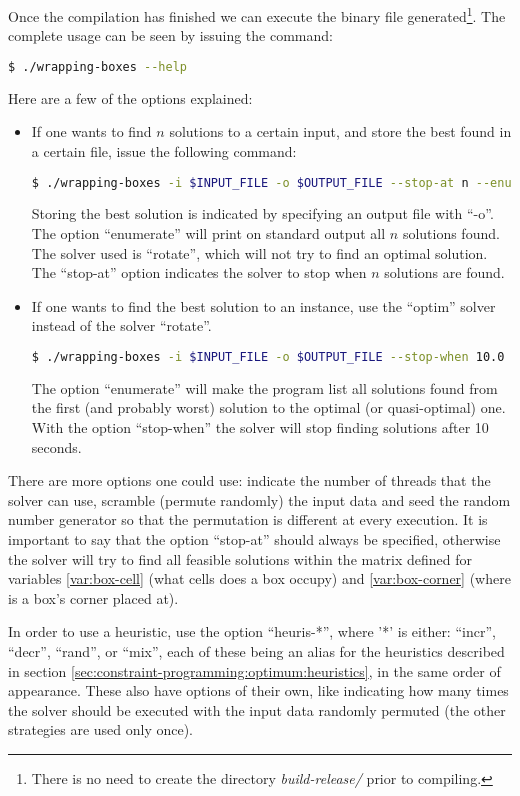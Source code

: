 Once the compilation has finished we can execute the binary file generated\footnote{ There
is no need to create the directory \textit{build-release/} prior to compiling.}. The
complete usage can be seen by issuing the command:
\begin{lstlisting}[language=bash]
$ ./wrapping-boxes --help
\end{lstlisting}

Here are a few of the options explained:
\begin{itemize}
	\item If one wants to find $n$ solutions to a certain input, and store the
	best found in a certain file, issue the following command:
\begin{lstlisting}[language=bash]
$ ./wrapping-boxes -i $INPUT_FILE -o $OUTPUT_FILE --stop-at n --enumerate --rotate
\end{lstlisting}
	
	Storing the best solution is indicated by specifying an output file with ``-o''.
	The option ``enumerate'' will print on standard output all $n$ solutions found.
	The solver used is ``rotate'', which will not try to find an optimal solution.
	The ``stop-at'' option indicates the solver to stop when $n$ solutions are
	found.
	
	\item If one wants to find the best solution to an instance, use the ``optim'' solver
	instead of the solver ``rotate''.
\begin{lstlisting}[language=bash]
$ ./wrapping-boxes -i $INPUT_FILE -o $OUTPUT_FILE --stop-when 10.0 --enumerate --optim
\end{lstlisting}
	
	The option ``enumerate'' will make the program list all solutions found from
	the first (and probably worst) solution to the optimal (or quasi-optimal) one.
	With the option ``stop-when'' the solver will stop finding solutions after 10 seconds.
\end{itemize}

There are more options one could use: indicate the number of threads that the solver
can use, scramble (permute randomly) the input data and seed the random number generator
so that the permutation is different at every execution. It is important to say that
the option ``stop-at'' should always be specified, otherwise the solver will try to
find all feasible solutions within the matrix defined for variables \ref{var:box-cell}
(what cells does a box occupy) and \ref{var:box-corner} (where is a box's corner placed at).

\hfill

In order to use a heuristic, use the option ``heuris-*'', where '*' is either: ``incr'',
``decr'', ``rand'', or ``mix'', each of these being an alias for the heuristics
described in section \ref{sec:constraint-programming:optimum:heuristics}, in the same
order of appearance. These also have options of their own, like indicating how many
times the solver should be executed with the input data randomly permuted (the other
strategies are used only once).

